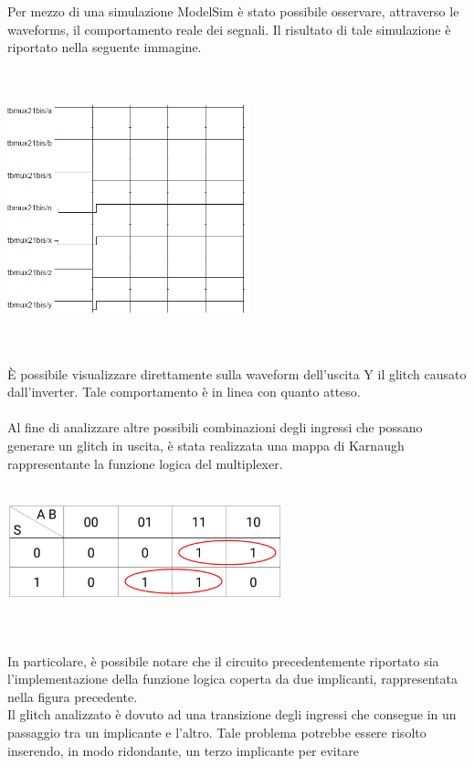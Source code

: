 \documentclass[11pt,  english, makeidx, a4paper, titlepage, oneside]{book}
\begin{document}
\\\\
Per mezzo di una simulazione ModelSim è stato possibile osservare,
attraverso le waveforms, il comportamento reale dei segnali. Il risultato
di tale simulazione è riportato nella seguente immagine.\\
\\\\
\centerline{\includegraphics[width=7cm]{./img/Lab_1/Es_4/Glitch.png}}
\\\\
È possibile visualizzare direttamente sulla waveform dell'uscita Y
il glitch causato dall'inverter. Tale comportamento è in linea con 
quanto atteso.
\\\\
Al fine di analizzare altre possibili combinazioni degli ingressi
che possano generare un glitch in uscita, è stata realizzata una 
mappa di Karnaugh rappresentante la funzione logica del multiplexer.
\\\\
\centerline{\includegraphics[width=8cm]{./img/Lab_1/Es_4/Mappa_K_coperta.png}}
\\\\
In particolare, è possibile notare che il circuito precedentemente riportato sia l'implementazione della funzione logica coperta da due implicanti, rappresentata nella figura precedente.
\\
Il glitch analizzato è dovuto ad una transizione degli ingressi che consegue in un passaggio
tra un implicante e l'altro. Tale problema potrebbe essere risolto
inserendo, in modo ridondante, un terzo implicante per evitare
\end{document}
